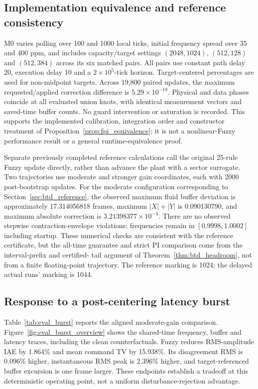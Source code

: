 \subsection{Implementation equivalence and reference consistency}
\label{subsec:eval_implementation_reference}

M0 varies polling over 100 and 1000 local ticks, initial frequency
spread over 35 and 400 ppm, and includes capacity/target settings
$(2048,1024)$, $(512,128)$ and $(512,384)$ across its six matched pairs.
All pairs use constant path delay 20, execution delay 10 and a
$2\times10^5$-tick horizon. Target-centered percentages are used for
non-midpoint targets. Across 19,800 paired updates, the maximum
requested/applied correction difference is $5.29\times10^{-18}$.
Physical and data phases coincide at all evaluated union knots, with
identical measurement vectors and saved-time buffer counts. No guard
intervention or saturation is recorded. This supports the implemented
calibration, integration order and constructor treatment of
Proposition~\ref{prop:fpi_equivalence}; it is not a nonlinear-Fuzzy
performance result or a general runtime-equivalence proof.

Separate previously completed reference calculations call the original
25-rule Fuzzy update directly, rather than advance the plant with a
sector surrogate. Two trajectories use moderate and stronger gain
coordinates, each with 2000 post-bootstrap updates. For the moderate
configuration corresponding to Section~\ref{sec:btd_reference}, the
observed maximum fluid buffer deviation is approximately 17.314056818
frames, maximum $|X|+|Y|$ is 0.090130790, and maximum absolute correction
is $3.21398377\times10^{-4}$. There are no observed stepwise
contraction-envelope violations; frequencies remain in
$[0.9998,1.0002]$ including startup. These numerical checks are
consistent with the reference certificate, but the all-time guarantee
and strict PI comparison come from the interval-prefix and certified-
tail argument of Theorem~\ref{thm:btd_headroom}, not from a finite
floating-point trajectory. The reference marking is 1024; the delayed
actual runs' marking is 1044.

\subsection{Response to a post-centering latency burst}
\label{subsec:eval_burst}

Table~\ref{tab:eval_burst} reports the aligned moderate-gain comparison.
Figure~\ref{fig:eval_burst_overview} shows the shared-time frequency,
buffer and latency traces, including the clean counterfactuals.
Fuzzy reduces RMS-amplitude IAE by 1.864\% and mean command TV by
15.938\%. Its disagreement RMS is 0.096\% higher, instantaneous RMS
peak is 2.396\% higher, and target-referenced buffer excursion is one
frame larger. These endpoints establish a tradeoff at this deterministic
operating point, not a uniform disturbance-rejection advantage.

